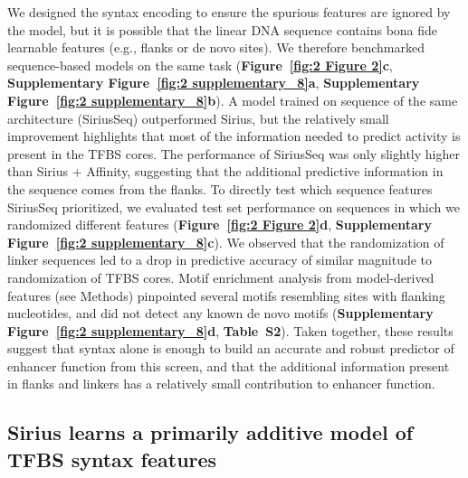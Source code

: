 We designed the syntax encoding to ensure the spurious features are ignored by the model, but it is possible that the linear DNA sequence contains bona fide learnable features (e.g., flanks or de novo sites). We therefore benchmarked sequence-based models on the same task (\textbf{Figure~\ref{fig:2 Figure 2}c}, \textbf{Supplementary Figure~\ref{fig:2 supplementary_8}a}, \textbf{Supplementary Figure~\ref{fig:2 supplementary_8}b})\cite{Ghandi2014-ql}. A model trained on sequence of the same architecture (SiriusSeq) outperformed Sirius, but the relatively small improvement highlights that most of the information needed to predict activity is present in the TFBS cores. The performance of SiriusSeq was only slightly higher than Sirius + Affinity, suggesting that the additional predictive information in the sequence comes from the flanks. To directly test which sequence features SiriusSeq prioritized, we evaluated test set performance on sequences in which we randomized different features (\textbf{Figure~\ref{fig:2 Figure 2}d}, \textbf{Supplementary Figure~\ref{fig:2 supplementary_8}c}). We observed that the randomization of linker sequences led to a drop in predictive accuracy of similar magnitude to randomization of TFBS cores. Motif enrichment analysis from model-derived features (see Methods) pinpointed several motifs resembling sites with flanking nucleotides, and did not detect any known de novo motifs (\textbf{Supplementary Figure~\ref{fig:2 supplementary_8}d}, \textbf{Table~S2}). Taken together, these results suggest that syntax alone is enough to build an accurate and robust predictor of enhancer function from this screen, and that the additional information present in flanks and linkers has a relatively small contribution to enhancer function.

\subsection{Sirius learns a primarily additive model of TFBS syntax features}

